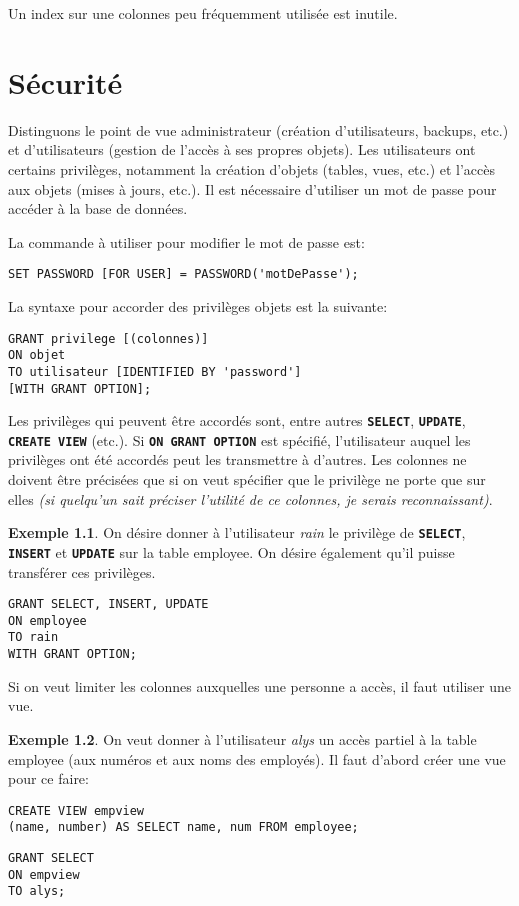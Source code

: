 \documentclass[a4paper, 12pt]{report}
\newcommand{\textSQL}[1]{\texttt{\textbf{#1}}}
\theoremstyle{definition} \newtheorem{ex}{Exemple}
\begin{document}
Un index sur une colonnes peu fréquemment utilisée est inutile.
\chapter{Sécurité}
Distinguons le point de vue administrateur (création d'utilisateurs, backups, etc.) et d'utilisateurs (gestion de l'accès à ses propres objets). Les utilisateurs ont certains privilèges, notamment la création d'objets (tables, vues, etc.) et l'accès aux objets (mises à jours, etc.). Il est nécessaire d'utiliser un mot de passe pour accéder à la base de données.

La commande à utiliser pour modifier le mot de passe est:
\begin{lstlisting}[frame=single]
SET PASSWORD [FOR USER] = PASSWORD('motDePasse');
\end{lstlisting}

La syntaxe pour accorder des privilèges objets est la suivante:
\begin{lstlisting}[frame=single]
GRANT privilege [(colonnes)]
ON objet
TO utilisateur [IDENTIFIED BY 'password']
[WITH GRANT OPTION];
\end{lstlisting}
Les privilèges qui peuvent être accordés sont, entre autres \textSQL{SELECT}, \textSQL{UPDATE}, \textSQL{CREATE VIEW} (etc.). Si \textSQL{ON GRANT OPTION} est spécifié, l'utilisateur auquel les privilèges ont été accordés peut les transmettre à d'autres. Les colonnes ne doivent être précisées que si on veut spécifier que le privilège ne porte que sur elles \emph{(si quelqu'un sait préciser l'utilité de ce colonnes, je serais reconnaissant)}.

\begin{ex}
On désire donner à l'utilisateur \emph{rain} le privilège de \textSQL{SELECT}, \textSQL{INSERT} et \textSQL{UPDATE} sur la table employee. On désire également qu'il puisse transférer ces privilèges.
 \begin{lstlisting}[frame=single]
GRANT SELECT, INSERT, UPDATE 
ON employee
TO rain
WITH GRANT OPTION;
\end{lstlisting}
\end{ex}

Si on veut limiter les colonnes auxquelles une personne a accès, il faut utiliser une vue.
\begin{ex}
On veut donner à l'utilisateur \emph{alys} un accès partiel à la table employee (aux numéros et aux noms des employés). Il faut d'abord créer une vue pour ce faire:
\begin{lstlisting}[frame=single]
CREATE VIEW empview
(name, number) AS SELECT name, num FROM employee;
\end{lstlisting}
\begin{lstlisting}[frame=single]
GRANT SELECT
ON empview
TO alys;
\end{lstlisting}
\end{ex}
\end{document}
